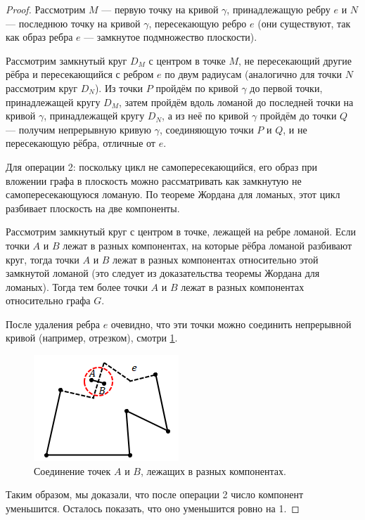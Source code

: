 \begin{proof}
    Рассмотрим $M$ — первую точку на кривой $\gamma$, принадлежащую ребру $e$ и $N$ — последнюю точку на кривой $\gamma$, пересекающую ребро $e$ (они существуют, так как образ ребра $e$ — замкнутое подмножество плоскости).

    Рассмотрим замкнутый круг $D_M$ с центром в точке $M$, не пересекающий другие рёбра и пересекающийся с ребром $e$ по двум радиусам (аналогично для точки $N$ рассмотрим круг $D_N$). Из точки $P$ пройдём по кривой $\gamma$ до первой точки, принадлежащей кругу $D_M$, затем пройдём вдоль ломаной до последней точки на кривой $\gamma$, принадлежащей кругу $D_N$, а из неё по кривой $\gamma$ пройдём до точки $Q$ — получим непрерывную кривую $\gamma$, соединяющую точки $P$ и $Q$, и не пересекающую рёбра, отличные от $e$.

    Для операции 2: поскольку цикл не самопересекающийся, его образ при вложении графа в плоскость можно рассматривать как замкнутую не самопересекающуюся ломаную. По теореме Жордана для ломаных, этот цикл разбивает плоскость на две компоненты.

    Рассмотрим замкнутый круг с центром в точке, лежащей на ребре ломаной. Если точки $A$ и $B$ лежат в разных компонентах, на которые рёбра ломаной разбивают круг, тогда точки $A$ и $B$ лежат в разных компонентах относительно этой замкнутой ломаной (это следует из доказательства теоремы Жордана для ломаных). Тогда тем более точки $A$ и $B$ лежат в разных компонентах относительно графа $G$.

    После удаления ребра $e$ очевидно, что эти точки можно соединить непрерывной кривой (например, отрезком), смотри \ref{fig:c6.2}.

    \begin{figure}[h]
        \centering
        \includegraphics[scale=0.8]{images/c6.2.png}
        \caption{Соединение точек $A$ и $B$, лежащих в разных компонентах.}
        \label{fig:c6.2}
    \end{figure}

    Таким образом, мы доказали, что после операции 2 число компонент уменьшится. Осталось показать, что оно уменьшится ровно на 1.


\end{proof}
